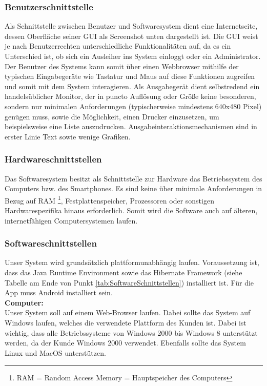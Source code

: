 \documentclass[fontsize=12pt,paper=a4,twoside]{scrartcl}
\begin{document}
\subsubsection{Benutzerschnittstelle} \label{subsubsec:BenutzerSchnittstellen} Als Schnittstelle zwischen Benutzer und Softwaresystem dient eine Internetseite, dessen Oberfläche seiner GUI als Screenshot unten dargestellt ist. Die GUI weist je nach Benutzerrechten unterschiedliche Funktionalitäten auf, da es ein Unterschied ist, ob sich ein Ausleiher ins System einloggt oder ein Administrator. Der Benutzer des Systems kann somit über einen Webbrowser mithilfe der typischen Eingabegeräte wie Tastatur und Maus auf diese Funktionen zugreifen und somit mit dem System interagieren. Als Ausgabegerät dient selbstredend ein handelsüblicher Monitor, der in puncto Auflösung oder Größe keine besonderen, sondern nur minimalen Anforderungen (typischerweise mindestens 640x480 Pixel) genügen muss, sowie die Möglichkeit, einen Drucker einzusetzen, um beispielsweise eine Liste auszudrucken. Ausgabeinteraktionsmechanismen sind in erster Linie Text sowie wenige Grafiken. 

\subsubsection{Hardwareschnittstellen} \label{subsubsec:Hardware} Das Softwaresystem besitzt als Schnittstelle zur Hardware das Betriebssystem des Computers bzw. des Smartphones. Es sind keine über minimale Anforderungen in Bezug auf RAM \footnote{RAM = Random Access Memory = Hauptspeicher des Computers}, Festplattenspeicher, Prozessoren oder sonstigen Hardwarespezifika hinaus erforderlich. Somit wird die Software auch auf älteren, internetfähigen Computersystemen laufen.\\

\subsubsection{Softwareschnittstellen} \label{subsubsec:Software}

Unser System wird grundsätzlich plattformunabhängig laufen. Voraussetzung ist, dass das Java Runtime Environment sowie das Hibernate Framework (siehe Tabelle am Ende von Punkt \ref{tab:SoftwareSchnittstellen}) installiert ist. Für die App muss Android installiert sein.\\

\textbf{Computer:}\\
Unser System soll auf einem Web-Browser laufen. Dabei sollte das System auf Windows laufen, welches die verwendete Plattform des Kunden ist. Dabei ist wichtig, dass alle Betriebssysteme von Windows 2000 bis Windows 8 unterstützt werden, da der Kunde Windows 2000 verwendet. Ebenfalls sollte das System Linux und MacOS unterstützen.\\
\end{document}
